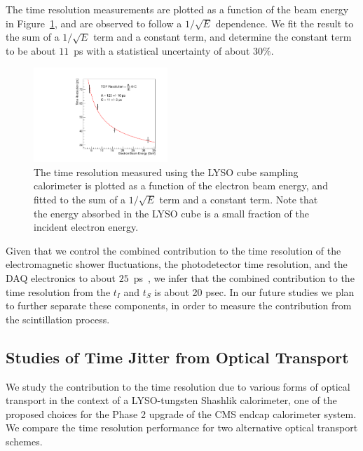 \documentclass[12pt]{article}
\begin{document}
The time resolution measurements are plotted as a function of the
beam energy in Figure~\ref{fig:LYSOCubeTOFResolutionVsEnergy}, and are observed
to follow a $1/\sqrt{E}$ dependence. We fit the result to the sum of a 
$1/\sqrt{E}$ term and a constant term, and determine the constant term to
be about $11$~ps with a statistical uncertainty of about $30\%$. 

\begin{figure}[h] \centering
\includegraphics[width=0.45\textwidth]{figs/TimeResolutionVsEnergy_CrystalCube} 
\caption{ The time resolution measured using the LYSO cube
sampling calorimeter is plotted as a function of the electron beam energy, 
and fitted to the sum of a $1/\sqrt{E}$ term and a constant term. Note that the energy absorbed in the LYSO cube is a small fraction of the incident electron energy.}
\label{fig:LYSOCubeTOFResolutionVsEnergy}
\end{figure}

Given that we control the combined contribution to the time 
resolution of the electromagnetic shower
fluctuations, the photodetector time resolution, and the DAQ electronics
to about $25$~ps~\cite{MCPFastCaloNIMA}, we infer that the combined contribution to the time resolution from the $t_I$ and $t_S$ is about 20 psec. In our future studies we plan to further separate these components, in order to measure the contribution from the scintillation process.




\subsection{Studies of Time Jitter from Optical Transport}

We study the contribution to the time resolution due to
various forms of optical transport in the context of a LYSO-tungsten Shashlik
calorimeter, one of the proposed choices for the Phase 2 upgrade of the
CMS endcap calorimeter system. We compare the time  resolution
performance for two alternative optical transport schemes. 
\end{document}

